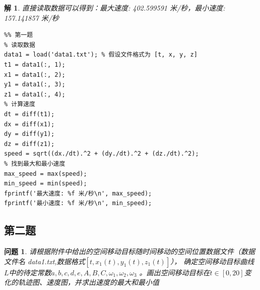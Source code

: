 \documentclass[a4paper, 12pt]{ctexart}
\newtheorem*{theorem}{解}
\newtheorem*{example}{问题}
\begin{document}
\begin{theorem}
直接读取数据可以得到：最大速度: 402.599591 米/秒，最小速度: 157.141857 米/秒
\begin{lstlisting}
%% 第一题
% 读取数据
data1 = load('data1.txt'); % 假设文件格式为 [t, x, y, z]
t1 = data1(:, 1);
x1 = data1(:, 2);
y1 = data1(:, 3);
z1 = data1(:, 4);
% 计算速度
dt = diff(t1);
dx = diff(x1);
dy = diff(y1);
dz = diff(z1);
speed = sqrt((dx./dt).^2 + (dy./dt).^2 + (dz./dt).^2);
% 找到最大和最小速度
max_speed = max(speed);
min_speed = min(speed);
fprintf('最大速度: %f 米/秒\n', max_speed);
fprintf('最小速度: %f 米/秒\n', min_speed);
\end{lstlisting}
\end{theorem}

\subsection{第二题}

\begin{example}
    请根据附件中给出的空间移动目标随时间移动的空间位置数据文件（数据文件名
    data1.txt,数据格式$[t,x_1(t),y_1(t),z_1(t)]$），
    确定空间移动目标曲线$L$中的待定常数$a,b,c,d,e,A,B,C,\omega_1,\omega_2,\omega_3$
    。画出空间移动目标在$t\in [0,20]$变化的轨迹图、速度图，并求出速度的最大和最小值
\end{example}
\end{document}
